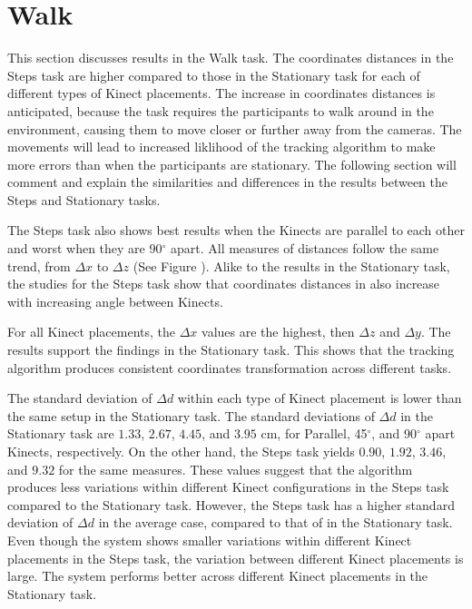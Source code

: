 \section{Walk}
\label{sec:discussion_walk}

This section discusses results in the Walk task. The coordinates distances in the Steps task are higher compared to those in the Stationary task for each of different types of Kinect placements. The increase in coordinates distances is anticipated, because the task requires the participants to walk around in the environment, causing them to move closer or further away from the cameras. The movements will lead to increased liklihood of the tracking algorithm to make more errors than when the participants are stationary. The following section will comment and explain the similarities and differences in the results between the Steps and Stationary tasks.

The Steps task also shows best results when the Kinects are parallel to each other and worst when they are 90$^{\circ}$ apart. All measures of distances follow the same trend, from $\Delta x$ to $\Delta z$ (See Figure ). Alike to the results in the Stationary task, the studies for the Steps task show that coordinates distances in also increase with increasing angle between Kinects.

For all Kinect placements, the $\Delta x$ values are the highest, then $\Delta z$ and $\Delta y$. The results support the findings in the Stationary task. This shows that the tracking algorithm produces consistent coordinates transformation across different tasks.

The standard deviation of $\Delta d$ within each type of Kinect placement is lower than the same setup in the Stationary task. The standard deviations of $\Delta d$ in the Stationary task are $1.33$, $2.67$, $4.45$, and $3.95$ cm, for Parallel, 45$^{\circ}$, and 90$^{\circ}$ apart Kinects, respectively. On the other hand, the Steps task yields $0.90$, $1.92$, $3.46$, and $9.32$ for the same measures. These values suggest that the algorithm produces less variations within different Kinect configurations in the Steps task compared to the Stationary task. However, the Steps task has a higher standard deviation of $\Delta d$ in the average case, compared to that of in the Stationary task. Even though the system shows smaller variations within different Kinect placements in the Steps task, the variation between different Kinect placements is large. The system performs better across different Kinect placements in the Stationary task.

